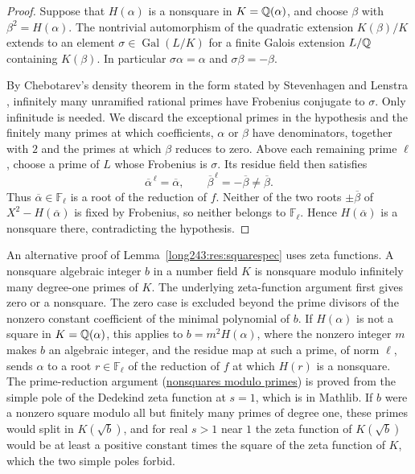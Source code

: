 \documentclass[11pt]{article}
\newcommand{\Fp}{\mathbb{F}}
\DeclareMathOperator{\Gal}{Gal}
\begin{document}
\begin{proof}
Suppose that $H(\alpha)$ is a nonsquare in $K=\mathbb{Q}(\alpha)$, and
choose $\beta$ with $\beta^2=H(\alpha)$. The nontrivial automorphism
of the quadratic extension $K(\beta)/K$ extends to an element
$\sigma\in\Gal(L/K)$ for a finite Galois extension $L/\mathbb{Q}$ containing
$K(\beta)$. In particular $\sigma\alpha=\alpha$ and
$\sigma\beta=-\beta$.

By Chebotarev's density theorem in the form stated by Stevenhagen
and Lenstra \cite[\S3, p.~15]{stevenhagenlenstra1996}, infinitely many
unramified rational primes have Frobenius conjugate to $\sigma$.
Only infinitude is needed. We discard the exceptional primes in the
hypothesis and the finitely many primes at which coefficients, $\alpha$
or $\beta$ have denominators, together with $2$ and the primes at which
$\beta$ reduces to zero. Above each
remaining prime $\ell$, choose a prime of $L$ whose Frobenius is
$\sigma$. Its residue field then satisfies
\[
 \overline\alpha^{\,\ell}=\overline\alpha,\qquad
 \overline\beta^{\,\ell}=-\overline\beta\ne\overline\beta.
\]
Thus $\overline\alpha\in\Fp_\ell$ is a root of the reduction of $f$.
Neither of the two roots $\pm\overline\beta$ of
$X^2-H(\overline\alpha)$ is fixed by Frobenius, so neither belongs
to $\Fp_\ell$. Hence $H(\overline\alpha)$ is a nonsquare there,
contradicting the hypothesis.
\end{proof}

An alternative proof of Lemma~\ref{long243:res:squarespec} uses zeta
functions. A nonsquare algebraic integer $b$ in a number field $K$
is nonsquare modulo infinitely many degree-one primes of $K$. The underlying
zeta-function argument first gives zero or a nonsquare. The zero case is
excluded beyond the prime divisors of the nonzero constant coefficient of the
minimal polynomial of $b$. If
$H(\alpha)$ is not a square in $K=\mathbb{Q}(\alpha)$, this applies to
$b=m^2H(\alpha)$, where the nonzero integer $m$ makes $b$ an algebraic
integer, and the residue map at such a prime, of norm $\ell$, sends $\alpha$
to a root $r\in\Fp_\ell$ of the reduction of $f$ at which $H(r)$ is a
nonsquare. The prime-reduction argument
(\href{https://github.com/wcook04/plectis-erdos/blob/e21782a3e5edf1d7e2e7bfca67341356dacfc042/lean/ErdosProblems/Shared/NonsquareModuloPrimes.lean\#L160-L192}{nonsquares modulo primes})
is proved from the simple pole of the Dedekind zeta function at $s=1$, which
is in Mathlib. If $b$ were a nonzero square modulo all but finitely many
primes of degree one, these primes would split in $K(\sqrt b)$, and for real
$s>1$ near $1$ the zeta function of $K(\sqrt b)$ would be at least a positive
constant times the square of the zeta function of $K$, which the two simple
poles forbid.
\end{document}
